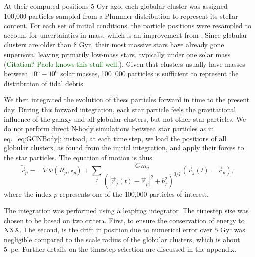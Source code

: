 \documentclass{aa}
\newcommand{\salvatore}[1]{\textcolor{darkgreen}{{#1}}}
\begin{document}
    At their computed positions 5 Gyr ago, each globular cluster was assigned 100,000 particles sampled from a Plummer distribution to represent its stellar content. For each set of initial conditions, the particle positions were resampled to account for uncertainties in mass, which is an improvement from \citet{2023A&A...673A..44F}. Since globular clusters are older than 8 Gyr, their most massive stars have already gone supernova, leaving primarily low-mass stars, typically under one solar mass (\@\salvatore{Citation? Paolo knows this stuff well.}). Given that clusters usually have masses between $10^5-10^6$ solar masses, 100~000 particles is sufficient to represent the distribution of tidal debris.

    
    We then integrated the evolution of these particles forward in time to the present day. During this forward integration, each star particle feels the gravitational influence of the galaxy and all globular clusters, but not other star particles. We do not perform direct N-body simulations between star particles as in eq.~\ref{eq:GCNBody}; instead, at each time step, we load the positions of all globular clusters, as found from the initial integration, and apply their forces to the star particles. The equation of motion is thus: 
    \begin{equation}
      \ddot{\vec{r}}_p = -\nabla \Phi(R_p,z_p) + \left.\sum_{j} \frac{Gm_j}{\left(|\vec{r}_j(t) - \vec{r}_p|^2 + b_j^2\right)^{3/2}}\right. \left(\vec{r}_j(t)- \vec{r}_p\right),
      \end{equation} \label{eq:equation_of_motion_particle} where the index $p$ represents one of the 100,000 particles of interest.

    The integration was performed using a leapfrog integrator. The timestep size was chosen to be based on two critera. First, to ensure the conservation of energy to XXX. The second, is the drift in position due to numerical error over 5 Gyr was negligible compared to the scale radius of the globular clusters, which is about 5~pc. Further details on the timestep selection are discussed in the appendix.
\end{document}
